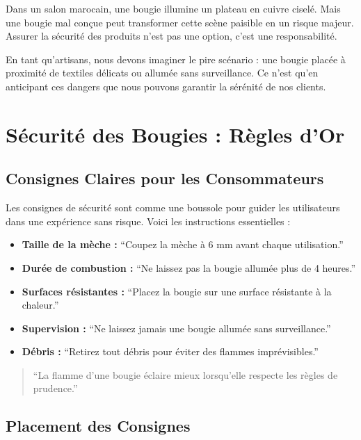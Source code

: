 \documentclass[11pt,fleqn,onecolumn,oneside]{book}
\begin{document}
Dans un salon marocain, une bougie illumine un plateau en cuivre ciselé. Mais une bougie mal conçue peut transformer cette scène paisible en un risque majeur. Assurer la sécurité des produits n’est pas une option, c’est une responsabilité.

\begin{example}
En tant qu’artisans, nous devons imaginer le pire scénario : une bougie placée à proximité de textiles délicats ou allumée sans surveillance. Ce n’est qu’en anticipant ces dangers que nous pouvons garantir la sérénité de nos clients.
\end{example}

\section{Sécurité des Bougies : Règles d’Or}

\subsection*{Consignes Claires pour les Consommateurs}

Les consignes de sécurité sont comme une boussole pour guider les utilisateurs dans une expérience sans risque. Voici les instructions essentielles :
\begin{itemize}
    \item \textbf{Taille de la mèche :} ``Coupez la mèche à 6 mm avant chaque utilisation.''
    \item \textbf{Durée de combustion :} ``Ne laissez pas la bougie allumée plus de 4 heures.''
    \item \textbf{Surfaces résistantes :} ``Placez la bougie sur une surface résistante à la chaleur.''
    \item \textbf{Supervision :} ``Ne laissez jamais une bougie allumée sans surveillance.''
    \item \textbf{Débris :} ``Retirez tout débris pour éviter des flammes imprévisibles.''
\end{itemize}

\begin{quote}
``La flamme d’une bougie éclaire mieux lorsqu’elle respecte les règles de prudence.''
\end{quote}

\subsection*{Placement des Consignes}
\end{document}
